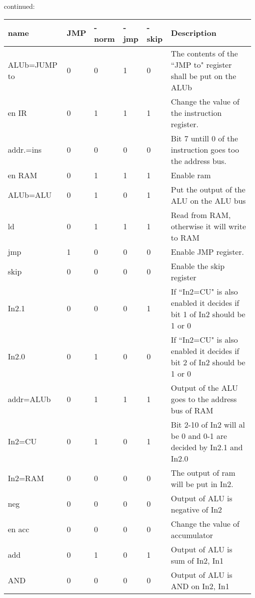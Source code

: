 \documentclass{article}
\begin{document}
	continued:
\begin{center}
	\begin{tabular}{l l l l l p{6cm} }
		\hline
		name 	 	& JMP  & -norm & -jmp & -skip &Description\\ \hline
		ALUb=JUMP to    & 0    & 0     & 1    & 0     &The contents of the ``JMP to" register shall be put on the ALUb	 \\ \hline
		en IR	        & 0    & 1     & 1    & 1     &Change the value of the instruction register. \\ \hline
		addr.=ins       & 0    & 0     & 0    & 0     &Bit 7 untill 0 of the instruction goes too the address bus. \\ \hline
		en RAM	        & 0    & 1     & 1    & 1     &Enable ram \\ \hline
		ALUb=ALU        & 0    & 1     & 0    & 1     &Put the output of the ALU on the ALU bus \\ \hline
		ld	        & 0    & 1     & 1    & 1     &Read from RAM, otherwise it will write to RAM \\ \hline
		jmp	        & 1    & 0     & 0    & 0     &Enable JMP register. \\ \hline
		skip	        & 0    & 0     & 0    & 0     &Enable the skip register\\ \hline
		In2.1       	& 0    & 0     & 0    & 1     &If ``In2=CU" is also enabled it decides if bit 1 of In2 should be 1 or 0\\ \hline
		In2.0       	& 0    & 1     & 0    & 0     &If ``In2=CU" is also enabled it decides if bit 2 of In2 should be 1 or 0\\  \hline
		addr=ALUb       & 0    & 1     & 1    & 1     &Output of the ALU goes to the address bus of RAM	 \\ \hline 
		In2=CU	        & 0    & 1     & 0    & 1     &Bit 2-10 of In2 will al be 0 and 0-1 are decided by In2.1 and In2.0\\ \hline
		In2=RAM	        & 0    & 0     & 0    & 0     &The output of ram will be put in In2.	 \\ \hline
		neg	        & 0    & 0     & 0    & 0     &Output of ALU is negative of In2	 \\ \hline
		en acc	        & 0    & 0     & 0    & 0     &Change the value of accumulator	 \\ \hline
		add	        & 0    & 1     & 0    & 1     &Output of ALU is sum of In2, In1	 \\ \hline
		AND	        & 0    & 0     & 0    & 0     &Output of ALU is AND on In2, In1	 \\ \hline

\end{tabular}
\end{center}
\end{document}
